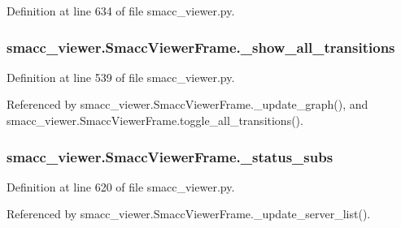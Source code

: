 Definition at line 634 of file smacc\+\_\+viewer.\+py.

\subsubsection[{\texorpdfstring{\+\_\+show\+\_\+all\+\_\+transitions}{_show_all_transitions}}]{\setlength{\rightskip}{0pt plus 5cm}smacc\+\_\+viewer.\+Smacc\+Viewer\+Frame.\+\_\+show\+\_\+all\+\_\+transitions\hspace{0.3cm}{\ttfamily [private]}}\hypertarget{classsmacc__viewer_1_1SmaccViewerFrame_adf4d6790cc3c124fd01509f6798eeb57}{}\label{classsmacc__viewer_1_1SmaccViewerFrame_adf4d6790cc3c124fd01509f6798eeb57}


Definition at line 539 of file smacc\+\_\+viewer.\+py.



Referenced by smacc\+\_\+viewer.\+Smacc\+Viewer\+Frame.\+\_\+update\+\_\+graph(), and smacc\+\_\+viewer.\+Smacc\+Viewer\+Frame.\+toggle\+\_\+all\+\_\+transitions().

\subsubsection[{\texorpdfstring{\+\_\+status\+\_\+subs}{_status_subs}}]{\setlength{\rightskip}{0pt plus 5cm}smacc\+\_\+viewer.\+Smacc\+Viewer\+Frame.\+\_\+status\+\_\+subs\hspace{0.3cm}{\ttfamily [private]}}\hypertarget{classsmacc__viewer_1_1SmaccViewerFrame_aa5b8451546ae5f2048b30670dada3ac4}{}\label{classsmacc__viewer_1_1SmaccViewerFrame_aa5b8451546ae5f2048b30670dada3ac4}


Definition at line 620 of file smacc\+\_\+viewer.\+py.



Referenced by smacc\+\_\+viewer.\+Smacc\+Viewer\+Frame.\+\_\+update\+\_\+server\+\_\+list().

